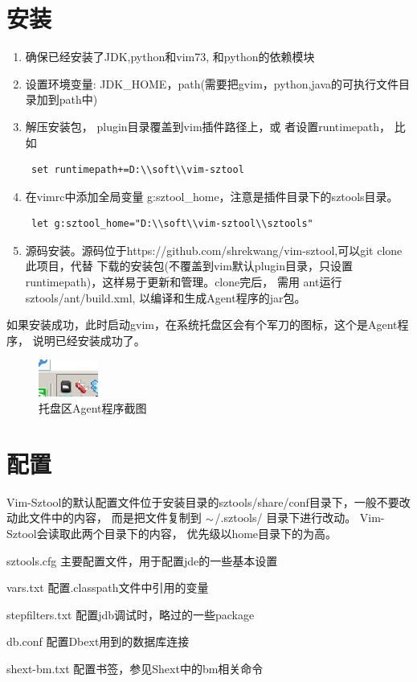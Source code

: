\documentclass[oneside,openany]{book}
\begin{document}
  \section{安装}
    \begin{enumerate}
      \item 确保已经安装了JDK,python和vim73, 和python的依赖模块
      \item 设置环境变量: JDK\_HOME，path(需要把gvim，python,java的可执行文件目录加到path中)
      \item 解压安装包， plugin目录覆盖到vim插件路径上，或
      者设置runtimepath， 比如
      \begin{verbatim} set runtimepath+=D:\\soft\\vim-sztool \end{verbatim}
      \item 在vimrc中添加全局变量 g:sztool\_home，注意是插件目录下的sztools目录。
      \begin{verbatim} let g:sztool_home="D:\\soft\\vim-sztool\\sztools" \end{verbatim}
      \item 源码安装。源码位于https://github.com/shrekwang/vim-sztool,可以git clone此项目，代替
      下载的安装包(不覆盖到vim默认plugin目录，只设置runtimepath)，这样易于更新和管理。clone完后，
      需用 ant运行sztools/ant/build.xml, 以编译和生成Agent程序的jar包。
    \end{enumerate}
   如果安装成功，此时启动gvim，在系统托盘区会有个军刀的图标，这个是Agent程序，
   说明已经安装成功了。

   \begin{figure}[htbp]%
      \centering
      \includegraphics[scale=0.8]{tray.jpg}
      \caption{托盘区Agent程序截图}
  \end{figure}

  \section{配置}
    Vim-Sztool的默认配置文件位于安装目录的sztools/share/conf目录下，一般不要改动此文件中的内容，
  而是把文件复制到 $\tiny{\sim}$/.sztools/ 目录下进行改动。 Vim-Sztool会读取此两个目录下的内容，
  优先级以home目录下的为高。
  \begin{description}
    \item{sztools.cfg} 主要配置文件，用于配置jde的一些基本设置
    \item{vars.txt} 配置.classpath文件中引用的变量
    \item{stepfilters.txt} 配置jdb调试时，略过的一些package
    \item{db.conf} 配置Dbext用到的数据库连接
    \item{shext-bm.txt} 配置书签，参见Shext中的bm相关命令
  \end{description}
  
\end{document}
